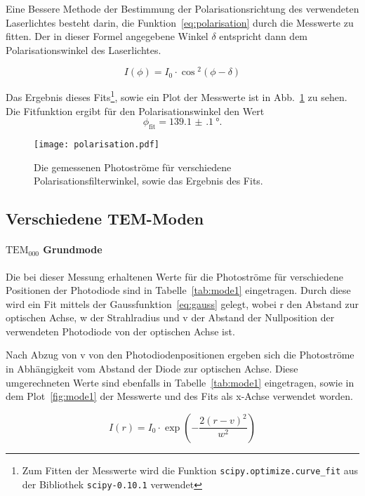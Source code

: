 Eine Bessere Methode der Bestimmung der Polarisationsrichtung des 
verwendeten Laserlichtes besteht darin, die 
Funktion~\eqref{eq:polarisation} durch die Messwerte zu fitten. Der 
in dieser Formel angegebene Winkel $\delta$ entspricht dann dem 
Polarisationswinkel des Laserlichtes.

%
\begin{equation}
I(\phi) = I_0 \cdot \cos{^2(\phi - \delta)}
\label{eq:polarisation}
\end{equation} 
%

Das Ergebnis dieses Fits\footnote{Zum Fitten der 
Messwerte wird die Funktion \texttt{scipy.optimize.curve\_fit} 
aus der Bibliothek \texttt{scipy-0.10.1} verwendet}, 
sowie ein Plot der Messwerte ist in Abb.~\ref{fig:polarisation} 
zu sehen. Die Fitfunktion ergibt für den Polarisationswinkel 
den Wert
\begin{equation}
\phi_\text{fit} = \SI{139.1(1)}{\degree}.
\end{equation}

%
\begin{figure}
\centering
  \texttt{[image: polarisation.pdf]}
  \caption{Die gemessenen Photoströme für verschiedene 
Polarisationsfilterwinkel, sowie das Ergebnis des Fits.}
\label{fig:polarisation}
\end{figure}
%
\subsection{Verschiedene TEM-Moden}
%
\paragraph{$\text{TEM}_{000}$ Grundmode}

Die bei dieser Messung erhaltenen Werte für die Photoströme 
für verschiedene Positionen der Photodiode sind in 
Tabelle~\ref{tab:mode1} eingetragen. 
Durch diese wird ein Fit mittels der Gaussfunktion~\eqref{eq:gauss} 
gelegt, wobei r den Abstand zur optischen Achse, w der Strahlradius 
und v der Abstand der Nullposition der verwendeten Photodiode von 
der optischen Achse ist.

Nach Abzug von v von den Photodiodenpositionen ergeben sich 
die Photoströme in Abhängigkeit vom Abstand der Diode zur 
optischen Achse. Diese umgerechneten Werte sind ebenfalls 
in Tabelle~\ref{tab:mode1} eingetragen, sowie in dem 
Plot~\ref{fig:mode1} 
der Messwerte und des Fits als x-Achse verwendet worden.

\begin{equation}
I(r) = I_0 \cdot \exp{\left(-\frac{2(r-v)^2}{w^2}\right)}
\label{eq:gauss}
\end{equation}

